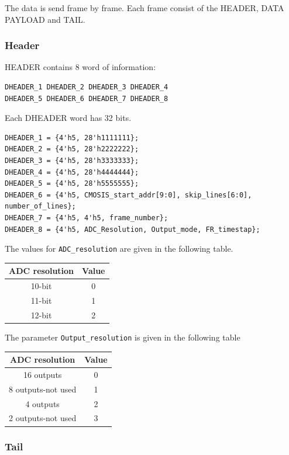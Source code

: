 The data is send frame by frame.
Each frame consist of the HEADER, DATA PAYLOAD and TAIL.


\subsubsection{Header}

HEADER contains 8 word of information:

\begin{verbatim}
DHEADER_1 DHEADER_2 DHEADER_3 DHEADER_4
DHEADER_5 DHEADER_6 DHEADER_7 DHEADER_8

\end{verbatim}
Each DHEADER word has 32 bits.
\begin{verbatim}
DHEADER_1 = {4'h5, 28'h1111111};
DHEADER_2 = {4'h5, 28'h2222222};
DHEADER_3 = {4'h5, 28'h3333333};
DHEADER_4 = {4'h5, 28'h4444444};
DHEADER_5 = {4'h5, 28'h5555555};
DHEADER_6 = {4'h5, CMOSIS_start_addr[9:0], skip_lines[6:0], number_of_lines};
DHEADER_7 = {4'h5, 4'h5, frame_number};
DHEADER_8 = {4'h5, ADC_Resolution, Output_mode, FR_timestap};
\end{verbatim}

The values for \verb/ADC_resolution/ are given in the following table.

\begin{tabular}{|c|c|}
\hline
ADC resolution				& Value 	\\	
\hline
10-bit				& 0 \\
\hline
11-bit				& 1 \\
\hline
12-bit				& 2 \\
\hline
\end{tabular}

The parameter \verb/Output_resolution/ is given in the following table

\begin{tabular}{|c|c|}
\hline
ADC resolution			& Value 	\\	
\hline
16 outputs				& 0 \\
\hline
8 outputs-not used		& 1 \\
\hline
4 outputs				& 2 \\
\hline
2 outputs-not used		& 3 \\

\hline
\end{tabular}


\subsubsection{Tail}

